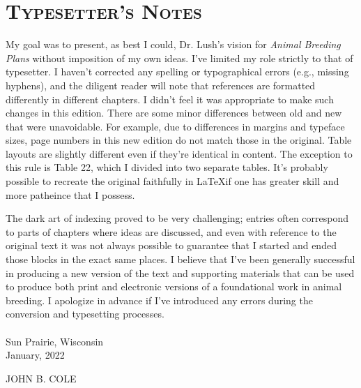 \chapter{\textsc{Typesetter's Notes}}



My goal was to present, as best I could, Dr. Lush's vision for \textit{Animal
Breeding Plans} without imposition of my own ideas. I've limited my role
strictly to that of typesetter. I haven't corrected any spelling or
typographical errors (e.g., missing hyphens), and the diligent reader will
note that references are formatted differently in different chapters. I didn't
feel it was appropriate to make such changes in this edition.
There are some minor differences between old and new that were unavoidable. For
example, due to differences in margins and typeface sizes, page numbers in this
new edition do not match those in the original. Table layouts are slightly
different even if they're identical in content. The exception to this rule is
Table 22, which I divided into two separate tables. It's probably possible to
recreate the original faithfully in \LaTeX if one has greater skill and more
patheince that I possess.

The dark art of indexing proved to be very challenging; entries often correspond
to parts of chapters where ideas are discussed, and even with reference to the
original text it was not always possible to guarantee that I started and ended those
blocks in the exact same places. I believe that I've been generally successful
in producing a new version of the text and supporting materials
that can be used to produce both print and electronic versions of a
foundational work in animal breeding. I apologize in advance if I've introduced
any errors during the conversion and typesetting processes.\\
~\\
Sun Prairie, Wisconsin\\
January, 2022\\
\begin{flushright}
	JOHN B. COLE
\end{flushright}